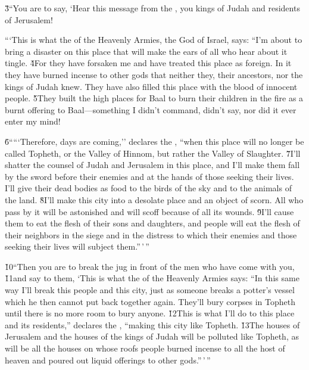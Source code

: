 \v{3}``You are to say, `Hear this message from the , you kings of Judah and residents of Jerusalem!

```This is what the  of the Heavenly Armies, the God of Israel, says: ``I'm about to bring a disaster on this place that will make the ears of all who hear about it tingle. \v{4}For they have forsaken me and have treated this place as foreign. In it they have burned incense to other gods that neither they, their ancestors, nor the kings of Judah knew. They have also filled this place with the blood of innocent people. \v{5}They built the high places for Baal to burn their children in the fire as a burnt offering to Baal---something I didn't command, didn't say, nor did it ever enter my mind!

\v{6}`````Therefore, days are coming,'' declares the , ``when this place will no longer be called Topheth, or the Valley of Hinnom, but rather the Valley of Slaughter. \v{7}I'll shatter the counsel of Judah and Jerusalem in this place, and I'll make them fall by the sword before their enemies and at the hands of those seeking their lives. I'll give their dead bodies as food to the birds of the sky and to the animals of the land. \v{8}I'll make this city into a desolate place and an object of scorn. All who pass by it will be astonished and will scoff because of all its wounds. \v{9}I'll cause them to eat the flesh of their sons and daughters, and people will eat the flesh of their neighbors in the siege and in the distress to which their enemies and those seeking their lives will subject them.''\,'\,''

\v{10}``Then you are to break the jug in front of the men who have come with you, \v{11}and say to them, `This is what the  of the Heavenly Armies says: ``In this same way I'll break this people and this city, just as someone breaks a potter's vessel which he then cannot put back together again. They'll bury corpses in Topheth until there is no more room to bury anyone. \v{12}This is what I'll do to this place and its residents,'' declares the , ``making this city like Topheth. \v{13}The houses of Jerusalem and the houses of the kings of Judah will be polluted like Topheth, as will be all the houses on whose roofs people burned incense to all the host of heaven and poured out liquid offerings to other gods.''\,'\,''

